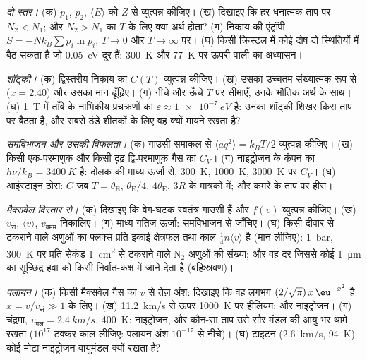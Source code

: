 \begin{exercise}[$\star\star$]\label{exo:b2:boltzmann-factor:5}
\emph{दो स्तर।} (क) $p_1$, $p_2$, $\langle E\rangle$ को $Z$ से व्युत्पन्न कीजिए। (ख)
दिखाइए कि हर धनात्मक ताप पर $N_2 < N_1$; और $N_2 >
N_1$ का $T$ के लिए क्या अर्थ होता? (ग) निकाय की एंट्रॉपी $S = -Nk_B\sum p_i\ln p_i$, $T \to 0$ और
$T \to \infty$ पर। (घ) किसी क्रिस्टल में कोई दोष दो
स्थितियों में बैठ सकता है जो \qty{0.05}{eV} दूर हैं: \qty{300}{K} और \qty{77}{K}
पर ऊपरी वाली का अध्यासन।
\end{exercise}

\begin{exercise}[$\star\star$]\label{exo:b2:boltzmann-factor:6}
\emph{शॉट्की।} (क) द्विस्तरीय निकाय का $C(T)$ व्युत्पन्न कीजिए। (ख) उसका
उच्चतम संख्यात्मक रूप से ($x = 2.40$) और उसका मान ढूँढ़िए। (ग) नीचे
और ऊँचे $T$ पर सीमाएँ, उनके भौतिक अर्थ के साथ। (घ) \qty{1}{T} में ताँबे के
नाभिकीय प्रचक्रणों का $\varepsilon \approx \qty{1e-7}{eV}$ है: उनका शॉट्की शिखर किस ताप पर
बैठता है, और सबसे ठंडे शीतकों के लिए वह क्यों मायने रखता
है?
\end{exercise}

\begin{exercise}[$\star\star$]\label{exo:b2:boltzmann-factor:7}
\emph{समविभाजन और उसकी विफलता।} (क) गाउसी समाकल से $\langle aq^2\rangle =
k_BT/2$ व्युत्पन्न कीजिए। (ख) किसी एक-परमाणुक और किसी
दृढ़ द्वि-परमाणुक गैस का $C_V$। (ग) नाइट्रोजन के कंपन का $h\nu/k_B = \qty{3400}{K}$ है:
दोलक की माध्य ऊर्जा से, \qty{300}{K}, \qty{1000}{K},
\qty{3000}{K} पर $C_V$। (घ) आइंस्टाइन ठोस: $C$ जब $T = \theta_{\text{E}}$, $\theta_{\text{E}}/4$,
$4\theta_{\text{E}}$, $3R$ के मात्रकों में; और कमरे के ताप पर हीरा।
\end{exercise}

\begin{exercise}[$\star\star$]\label{exo:b2:boltzmann-factor:8}
\emph{मैक्सवेल विस्तार से।} (क) दिखाइए कि वेग-घटक
स्वतंत्र गाउसी हैं और $f(v)$ व्युत्पन्न कीजिए। (ख) $v_{\text{सं}}$,
$\langle v\rangle$, $v_{\text{वमम}}$ निकालिए। (ग) माध्य गतिज ऊर्जा:
समविभाजन से जाँचिए। (घ) किसी दीवार से टकराने वाले अणुओं का फ्लक्स
प्रति इकाई क्षेत्रफल तथा काल $\tfrac14n\langle v\rangle$ है (मान लीजिए): \qty{1}{bar},
\qty{300}{K} पर प्रति सेकंड \qty{1}{cm^2} से टकराने वाले
N$_2$ अणुओं की संख्या; और वह दर जिससे कोई \qty{1}{\micro m} का सूच्छिद्र हवा को
किसी निर्वात-कक्ष में जाने देता है (बहिःस्रवण)।
\end{exercise}

\begin{exercise}[$\star\star$]\label{exo:b2:boltzmann-factor:9}
\emph{पलायन।} (क) किसी मैक्सवेल गैस का $v$ से तेज़ अंश: दिखाइए कि वह लगभग
$(2/\sqrt\pi)\,x\,\eu^{-x^2}$ है $x = v/v_{\text{सं}} \gg 1$ के लिए।
(ख) \qty{11.2}{km/s} से ऊपर \qty{1000}{K} पर हीलियम; और नाइट्रोजन। (ग) चंद्रमा,
$v_{\text{पल}} = \qty{2.4}{km/s}$, \qty{400}{K}: नाइट्रोजन, और कौन-सा
ताप उसे सौर मंडल की आयु भर थामे रखता ($10^{17}$
टक्कर-काल लीजिए: पलायन अंश $10^{-17}$ से नीचे)। (घ) टाइटन
(\qty{2.6}{km/s}, \qty{94}{K}) कोई मोटा नाइट्रोजन वायुमंडल क्यों रखता है?
\end{exercise}

